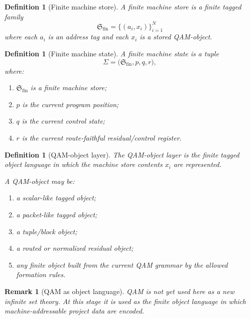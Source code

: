 \documentclass[12pt,a4paper]{article}
\newtheorem{definition}[theorem]{Definition}
\newtheorem{remark}[theorem]{Remark}
\begin{document}
\begin{definition}[Finite machine store]\label{def:finite-machine-store-computational-layer}
A \emph{finite machine store} is a finite tagged family
\[
\mathfrak{S}_{\mathrm{fin}}
=
\{(a_i,x_i)\}_{i=1}^{N}
\]
where each \(a_i\) is an address tag and each \(x_i\) is a stored QAM-object.
\end{definition}

\begin{definition}[Finite machine state]\label{def:finite-machine-state-computational-layer}
A \emph{finite machine state} is a tuple
\[
\Sigma
=
\bigl(
\mathfrak{S}_{\mathrm{fin}},
p,
q,
r
\bigr),
\]
where:
\begin{enumerate}[leftmargin=2em]
 \item \(\mathfrak{S}_{\mathrm{fin}}\) is a finite machine store;
 \item \(p\) is the current program position;
 \item \(q\) is the current control state;
 \item \(r\) is the current route-faithful residual/control register.
\end{enumerate}
\end{definition}

\begin{definition}[QAM-object layer]\label{def:qam-object-layer-computational-layer}
The \emph{QAM-object layer} is the finite tagged object language in which the machine store contents \(x_i\) are represented.

A QAM-object may be:
\begin{enumerate}[leftmargin=2em]
 \item a scalar-like tagged object;
 \item a packet-like tagged object;
 \item a tuple/block object;
 \item a routed or normalized residual object;
 \item any finite object built from the current QAM grammar by the allowed formation rules.
\end{enumerate}
\end{definition}

\begin{remark}[QAM as object language]\label{rem:qam-as-object-language-computational-layer}
QAM is not yet used here as a new infinite set theory. At this stage it is used as the finite object language in which machine-addressable project data are encoded.
\end{remark}
\end{document}
